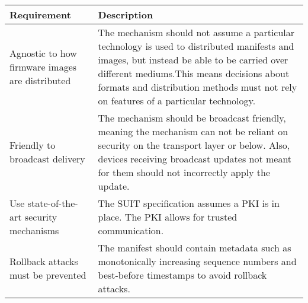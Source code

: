 \begin{longtable}[]{@{}ll@{}}
\toprule
\begin{minipage}[b]{0.41\columnwidth}\raggedright\strut
Requirement\strut
\end{minipage} & \begin{minipage}[b]{0.53\columnwidth}\raggedright\strut
Description\strut
\end{minipage}\tabularnewline
\midrule
\endhead
\begin{minipage}[t]{0.41\columnwidth}\raggedright\strut
Agnostic to how firmware images are distributed\strut
\end{minipage} & \begin{minipage}[t]{0.53\columnwidth}\raggedright\strut
The mechanism should not assume a particular technology is used to
distributed manifests and images, but instead be able to be carried over
different mediums.This means decisions about formats and distribution
methods must not rely on features of a particular technology.\strut
\end{minipage}\tabularnewline
\begin{minipage}[t]{0.41\columnwidth}\raggedright\strut
Friendly to broadcast delivery\strut
\end{minipage} & \begin{minipage}[t]{0.53\columnwidth}\raggedright\strut
The mechanism should be broadcast friendly, meaning the mechanism can
not be reliant on security on the transport layer or below. Also,
devices receiving broadcast updates not meant for them should not
incorrectly apply the update.\strut
\end{minipage}\tabularnewline
\begin{minipage}[t]{0.41\columnwidth}\raggedright\strut
Use state-of-the-art security mechanisms\strut
\end{minipage} & \begin{minipage}[t]{0.53\columnwidth}\raggedright\strut
The SUIT specification assumes a PKI is in place. The PKI allows for
trusted communication.\strut
\end{minipage}\tabularnewline
\begin{minipage}[t]{0.41\columnwidth}\raggedright\strut
Rollback attacks must be prevented\strut
\end{minipage} & \begin{minipage}[t]{0.53\columnwidth}\raggedright\strut
The manifest should contain metadata such as monotonically increasing
sequence numbers and best-before timestamps to avoid rollback
attacks.\strut
\end{minipage}\tabularnewline

\end{longtable}
